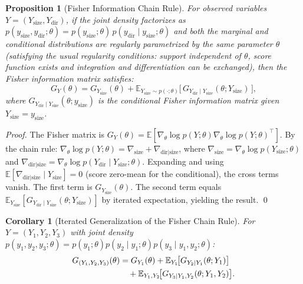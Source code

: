\documentclass[lettersize,journal]{IEEEtran}
\newtheorem{corollary}{Corollary}
\newtheorem{proposition}{Proposition}
\newcommand{\E}{\mathbb{E}}
\begin{document}
\begin{proposition}[Fisher Information Chain Rule]\label{prop:fisher-chain}
For observed variables $Y=(Y_{\mathrm{size}},Y_{\mathrm{dir}})$, if the
joint density factorizes as
$p(y_{\mathrm{size}},y_{\mathrm{dir}};\theta)=p(y_{\mathrm{size}};\theta)\,
p(y_{\mathrm{dir}}\mid y_{\mathrm{size}};\theta)$
and both the marginal and conditional distributions are regularly
parametrized by the \emph{same} parameter $\theta$ (satisfying the
usual regularity conditions: support independent of $\theta$, score
function exists and integration and differentiation can be exchanged),
then the Fisher information matrix satisfies:
\begin{equation}\label{eq:fisher-chain}
G_{Y}(\theta) = G_{Y_{\mathrm{size}}}(\theta)
  + \E_{Y_{\mathrm{size}}\sim p(\cdot;\theta)}\!\Big[\,G_{Y_{\mathrm{dir}}\mid Y_{\mathrm{size}}}(\theta;Y_{\mathrm{size}})\,\Big],
\end{equation}
where $G_{Y_{\mathrm{dir}}\mid Y_{\mathrm{size}}}(\theta;y_{\mathrm{size}})$
is the conditional Fisher information matrix given
$Y_{\mathrm{size}}=y_{\mathrm{size}}$.
\end{proposition}

\begin{proof}
The Fisher matrix is
$G_Y(\theta) = \E[\nabla_\theta \log p(Y;\theta)
  \nabla_\theta \log p(Y;\theta)^\top]$.
By the chain rule:
$\nabla_\theta \log p(Y;\theta) = \nabla_{\mathrm{size}} + \nabla_{\mathrm{dir}|\mathrm{size}}$,
where $\nabla_{\mathrm{size}} = \nabla_\theta \log p(Y_{\mathrm{size}};\theta)$
and $\nabla_{\mathrm{dir}|\mathrm{size}} = \nabla_\theta \log p(Y_{\mathrm{dir}}\mid Y_{\mathrm{size}};\theta)$.
Expanding and using $\E[\nabla_{\mathrm{dir}|\mathrm{size}}\mid Y_{\mathrm{size}}]=0$
(score zero-mean for the conditional), the cross terms vanish.
The first term is $G_{Y_{\mathrm{size}}}(\theta)$.
The second term equals
$\E_{Y_{\mathrm{size}}}[G_{Y_{\mathrm{dir}}\mid Y_{\mathrm{size}}}(\theta;Y_{\mathrm{size}})]$
by iterated expectation, yielding the result. \qed
\end{proof}

\begin{corollary}[Iterated Generalization of the Fisher Chain Rule]\label{cor:fisher-chain-3}
For $Y=(Y_1,Y_2,Y_3)$ with joint density
$p(y_1,y_2,y_3;\theta)=p(y_1;\theta)p(y_2\mid y_1;\theta)p(y_3\mid y_1,y_2;\theta)$:
\begin{align}
G_{(Y_1,Y_2,Y_3)}(\theta) &= G_{Y_1}(\theta)
  + \E_{Y_1}\!\big[G_{Y_2\mid Y_1}(\theta;Y_1)\big]\notag\\
  &\quad + \E_{Y_1,Y_2}\!\big[G_{Y_3\mid Y_1,Y_2}(\theta;Y_1,Y_2)\big].
\end{align}
\end{corollary}
\end{document}
